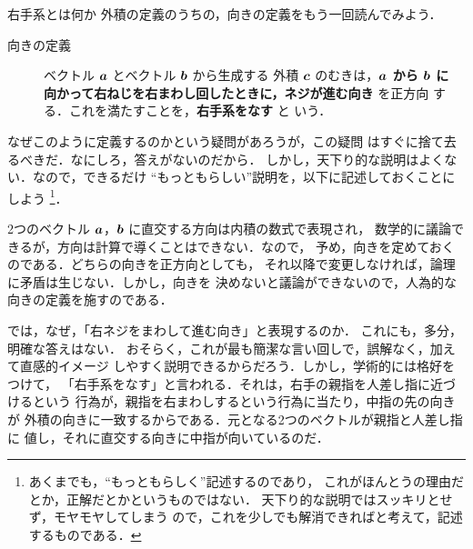                 \begin{memo}{右手系とは何か}
                    外積の定義のうちの，向きの定義をもう一回読んでみよう．

                    \begin{description}
                        \item[向きの定義]
                            ベクトル $\boldsymbol{a}$ とベクトル $\boldsymbol{b}$ から生成する
                            外積 $\boldsymbol{c}$ のむきは，\textbf{$\boldsymbol{a}$ から $\boldsymbol{b}$ に
                            向かって右ねじを右まわし回したときに，ネジが進む向き} を正方向
                            する．これを満たすことを，\textbf{右手系をなす} と
                            いう．
                    \end{description}


                    なぜこのように定義するのかという疑問があろうが，この疑問
                    はすぐに捨て去るべきだ．なにしろ，答えがないのだから．
                    しかし，天下り的な説明はよくない．なので，できるだけ
                    “もっともらしい”説明を，以下に記述しておくことにしよう
                        \footnote{
                            あくまでも，“もっともらしく”記述するのであり，
                            これがほんとうの理由だとか，正解だとかというものではない．
                            天下り的な説明ではスッキリとせず，モヤモヤしてしまう
                            ので，これを少しでも解消できればと考えて，記述
                            するものである．
                        }．

                    2つのベクトル $\boldsymbol{a}$，$\boldsymbol{b}$ に直交する方向は内積の数式で表現され，
                    数学的に議論できるが，方向は計算で導くことはできない．なので，
                    予め，向きを定めておくのである．どちらの向きを正方向としても，
                    それ以降で変更しなければ，論理に矛盾は生じない．しかし，向きを
                    決めないと議論ができないので，人為的な向きの定義を施すのである．

                    では，なぜ，「右ネジをまわして進む向き」と表現するのか．
                    これにも，多分，明確な答えはない．
                    おそらく，これが最も簡潔な言い回しで，誤解なく，加えて直感的イメージ
                    しやすく説明できるからだろう．しかし，学術的には格好をつけて，
                    「右手系をなす」と言われる．それは，右手の親指を人差し指に近づけるという
                    行為が，親指を右まわしするという行為に当たり，中指の先の向きが
                    外積の向きに一致するからである．元となる2つのベクトルが親指と人差し指に
                    値し，それに直交する向きに中指が向いているのだ．


\end{memo}
